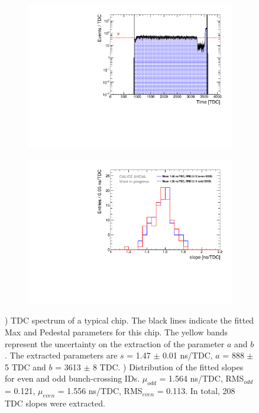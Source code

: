 \documentclass{JINST}
\begin{document}
\begin{figure}[htbp!]
  \begin{subfigure}[t]{0.49\textwidth}
    \centering
    \includegraphics[width=1\linewidth]{fig/ExampleTDCSpectra.pdf}
    \caption{} \label{fig:TDC_Spectrum}
  \end{subfigure}
  \hfill
  \begin{subfigure}[t]{0.49\textwidth}
    \centering
    \includegraphics[width=1\linewidth]{fig/SlopesTDC.pdf}
    \caption{} \label{fig:slopes}
  \end{subfigure}
  \caption{) TDC spectrum of a typical chip. The black lines indicate the fitted Max and Pedestal parameters for this chip. The yellow bands represent the uncertainty on the extraction of the parameter $a$ and $b$. The extracted parameters are $s$ = 1.47 $\pm$ 0.01 ns/TDC, $a$ = 888 $\pm$ 5 TDC and $b$ = 3613 $\pm$ 8 TDC. ) Distribution of the fitted slopes for even and odd bunch-crossing IDs. $\mu_{odd}$ = 1.564 ns/TDC, RMS$_{odd}$ = 0.121, $\mu_{even}$ = 1.556 ns/TDC, RMS$_{even}$ = 0.113. In total, 208 TDC slopes were extracted.}
\end{figure}
\end{document}
